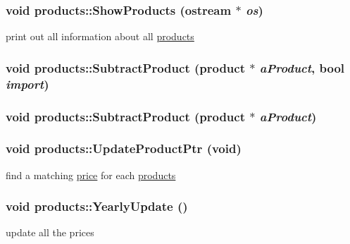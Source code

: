 \label{classproducts_a74c59dd845faf4570e5a4010722cfc95}
\hypertarget{classproducts_a4f87e6c90ed2a421f101b7a04668c5cc}{
\subsubsection[{ShowProducts}]{\setlength{\rightskip}{0pt plus 5cm}void products::ShowProducts (ostream $\ast$ {\em os})}}
\label{classproducts_a4f87e6c90ed2a421f101b7a04668c5cc}
print out all information about all \hyperlink{classproducts}{products} \hypertarget{classproducts_a87b32cc7b19b4082bf4ee0c7f01baafc}{
\subsubsection[{SubtractProduct}]{\setlength{\rightskip}{0pt plus 5cm}void products::SubtractProduct ({\bf product} $\ast$ {\em aProduct}, \/  bool {\em import})}}
\label{classproducts_a87b32cc7b19b4082bf4ee0c7f01baafc}
\hypertarget{classproducts_a85731ae226d4e23d1b83d4fa936e12e3}{
\subsubsection[{SubtractProduct}]{\setlength{\rightskip}{0pt plus 5cm}void products::SubtractProduct ({\bf product} $\ast$ {\em aProduct})}}
\label{classproducts_a85731ae226d4e23d1b83d4fa936e12e3}
\hypertarget{classproducts_a1f3ef16fd1cb7ca9dc7f3e9e4c257b27}{
\subsubsection[{UpdateProductPtr}]{\setlength{\rightskip}{0pt plus 5cm}void products::UpdateProductPtr (void)}}
\label{classproducts_a1f3ef16fd1cb7ca9dc7f3e9e4c257b27}
find a matching \hyperlink{classprice}{price} for each \hyperlink{classproducts}{products} \hypertarget{classproducts_a052853a033f88f5928b69a46ef279915}{
\subsubsection[{YearlyUpdate}]{\setlength{\rightskip}{0pt plus 5cm}void products::YearlyUpdate ()}}
\label{classproducts_a052853a033f88f5928b69a46ef279915}
update all the prices 

